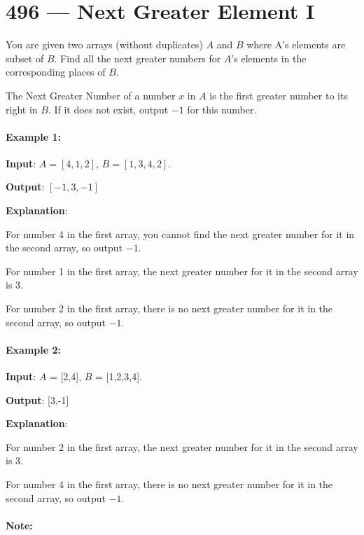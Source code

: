 \section{496 --- Next Greater Element I}
You are given two arrays (without duplicates) $A$ and $B$ where A's elements are subset of $B$. Find all the next greater numbers for $A$'s elements in the corresponding places of $B$.

The Next Greater Number of a number $x$ in $A$ is the first greater number to its right in $B$. If it does not exist, output $-1$ for this number.

\paragraph{Example 1:}

\begin{flushleft}
\textbf{Input}: $A = [4,1,2]$, $B = [1,3,4,2]$.

\textbf{Output}: $[-1,3,-1]$

\textbf{Explanation}:

For number 4 in the first array, you cannot find the next greater number for it in the second array, so output $-1$.

For number 1 in the first array, the next greater number for it in the second array is 3.

For number 2 in the first array, there is no next greater number for it in the second array, so output $-1$.
\end{flushleft}

\paragraph{Example 2:}

\begin{flushleft}
\textbf{Input}: $A$ = [2,4], $B$ = [1,2,3,4].

\textbf{Output}: [3,-1]

\textbf{Explanation}:

For number 2 in the first array, the next greater number for it in the second array is 3.

For number 4 in the first array, there is no next greater number for it in the second array, so output $-1$.
\end{flushleft}

\paragraph{Note:}

